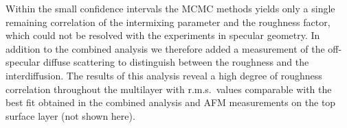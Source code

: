 Within the small confidence intervals the MCMC methods yields only a single remaining correlation of the intermixing parameter and the roughness factor, which could not be resolved with the experiments in specular geometry. In addition to the combined analysis we therefore added a measurement of the off-specular diffuse scattering to distinguish between the roughness and the interdiffusion. The results of this analysis reveal a high degree of roughness correlation throughout the multilayer with r.m.s.~values comparable with the best fit obtained in the combined analysis and AFM measurements on the top surface layer (not shown here).
